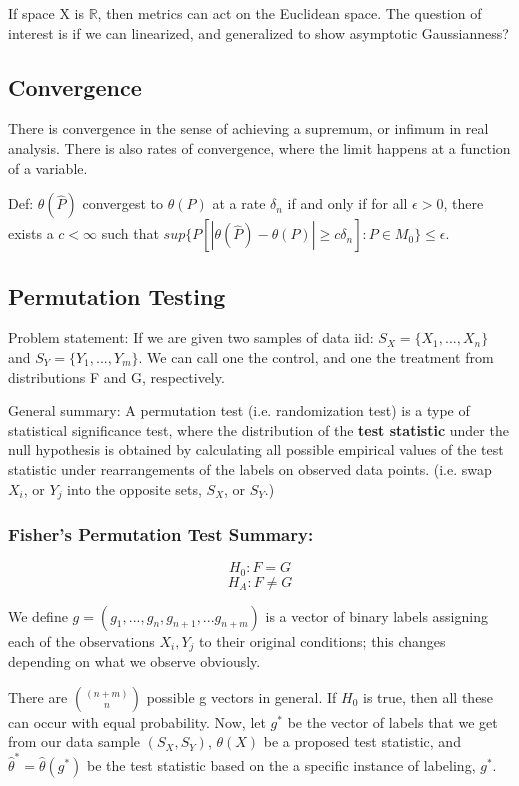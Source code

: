 \documentclass{article}
\begin{document}
		If space X is $\mathbb{R}$, then metrics can act on the Euclidean space. The question of interest is if we can linearized, and generalized to show asymptotic Gaussianness? 

	\subsection{Convergence}

		There is convergence in the sense of achieving a supremum, or infimum in real analysis. There is also rates of convergence, where the limit happens at a function of a variable.

		Def: $\theta(\hat{P})$ convergest to $\theta(P)$ at a rate $\delta_n$ if and only if for all $\epsilon > 0$, there exists a $c < \infty$ such that $sup\{P [ |\theta(\hat{P}) - \theta(P)| \ge c \delta_n ] : P \in M_0 \} \le \epsilon$.


	\subsection{Permutation Testing}

		Problem statement: If we are given two samples of data iid: $S_X = \{X_1,...,X_n\}$ and $S_Y = \{Y_1,...,Y_m\}$. We can call one the control, and one the treatment from distributions F and G, respectively. 

		General summary: 
		A permutation test (i.e. randomization test) is a type of statistical significance test, where the distribution of the \textbf{test statistic} under the null hypothesis is obtained by calculating all possible empirical values of the test statistic under rearrangements of the labels on observed data points. (i.e. swap $X_i$, or $Y_j$ into the opposite sets, $S_X$, or $S_Y$.)

		\subsubsection{Fisher's Permutation Test Summary:}

			$$H_0 : F = G$$
			$$H_A : F \neq G$$

			We define $g = (g_1, ..., g_n, g_{n+1}, ... g_{n+m})$ is a vector of binary labels assigning each of the observations $X_i,Y_j$ to their original conditions; this changes depending on what we observe obviously. 

			There are $\binom{(n+m)}{n}$ possible g vectors in general. If $H_0$ is true, then all these can occur with equal probability. Now, let $g^*$ be the vector of labels that we get from our data sample $(S_X, S_Y)$, $\theta(X)$ be a proposed test statistic, and $\hat{\theta}^* = \hat{\theta}(g^*)$ be the test statistic based on the a specific instance of labeling, $g^*$.
\end{document}
